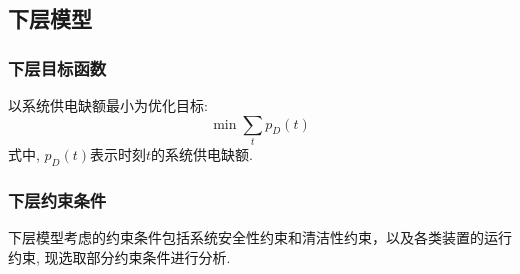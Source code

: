 \documentclass{article}
\begin{document}
\subsection{下层模型}
\subsubsection{下层目标函数}
以系统供电缺额最小为优化目标:
\begin{equation}
    \min\sum_tp_D(t)
\end{equation}
式中, $p_D(t)$表示时刻$t$的系统供电缺额.

\subsubsection{下层约束条件}
下层模型考虑的约束条件包括系统安全性约束和清洁性约束，以及各类装置的运行约束, 现选取部分约束条件进行分析.
\end{document}
